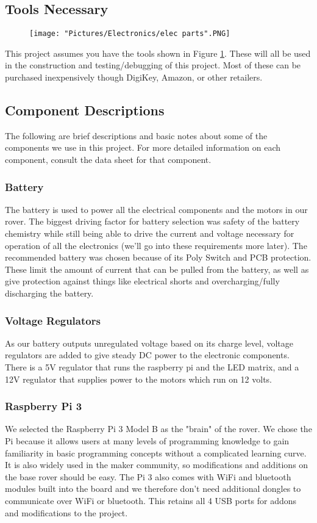 \documentclass[12pt]{article}
\begin{document}
\subsection{Tools Necessary}

\begin{figure}[H]
  	\centering
   	\texttt{[image: "Pictures/Electronics/elec parts".PNG]}
  	\caption{}
	\label{elec parts}
\end{figure}

This project assumes you have the tools shown in Figure \ref{elec parts}. These will all be used in the construction and testing/debugging of this project. Most of these can be purchased inexpensively though DigiKey, Amazon, or other retailers. 

\subsection{Component Descriptions}
The following are brief descriptions and basic notes about some of the components we use in this project. For more detailed information on each component, consult the data sheet for that component. 
\subsubsection{Battery}
The battery is used to power all the electrical components and the motors in our rover. The biggest driving factor for battery selection was safety of the battery chemistry while still being able to drive the current and voltage necessary for operation of all the electronics (we'll go into these requirements more later). The recommended battery was chosen because of its Poly Switch and PCB protection. These limit the amount of current that can be pulled from the battery, as well as give protection against things like electrical shorts and overcharging/fully discharging the battery. 
\subsubsection{Voltage Regulators}
As our battery outputs unregulated voltage based on its charge level, voltage regulators are added to give steady DC power to the electronic components. There is a 5V regulator that runs the raspberry pi and the LED matrix, and a 12V regulator that supplies power to the motors which run on 12 volts. 
\subsubsection{Raspberry Pi 3}
We selected the Raspberry Pi 3 Model B as the "brain" of the rover. We chose the Pi because it allows users at many levels of programming knowledge to gain familiarity in basic programming concepts without a complicated learning curve. It is also widely used in the maker community, so modifications and additions on the base rover should be easy. The Pi 3 also comes with WiFi and bluetooth modules built into the board and we therefore don't need additional dongles to communicate over WiFi or bluetooth.  This retains all 4 USB ports for addons and modifications to the project.  
\end{document}
